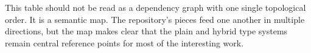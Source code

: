 This table should not be read as a dependency graph with one single topological order. It
is a semantic map. The repository's pieces feed one another in multiple directions, but the
map makes clear that the plain and hybrid type systems remain central reference points for
most of the interesting work.
